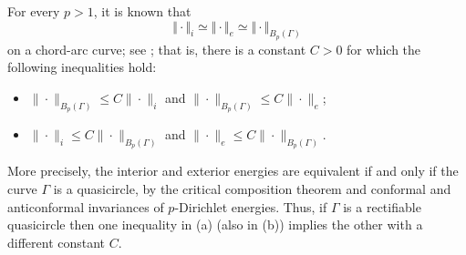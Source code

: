 \documentclass[11pt]{article}
\numberwithin{equation}{section}
\theoremstyle{remark}
\begin{document}
For every $p>1$, it is known that
\[
\Vert\cdot\Vert_i\simeq\Vert\cdot\Vert_e
\simeq\Vert\cdot\Vert_{B_p(\Gamma)}
\]
on a chord-arc curve; see \cite{LS}; that is,  there
is a constant $C>0$ for which the following inequalities hold:
 \begin{itemize}
\item[(a)]$\|\cdot\|_{B_{p}(\Gamma)}\le C \|\cdot\|_{i}$ and $\|\cdot\|_{B_{p}(\Gamma)}\le C \|\cdot\|_{e}$;
\item[(b)]$\|\cdot\|_{i}\le C\|\cdot\|_{B_{p}(\Gamma)}$ and $\|\cdot\|_{e}\le C\|\cdot\|_{B_{p}(\Gamma)}$.
\end{itemize}
More precisely, the interior and
exterior energies are equivalent if and only if the curve $\Gamma$ is a quasicircle, by the critical
composition theorem \cite[Theorem~12]{Bou} and conformal and anticonformal invariances of $p$-Dirichlet energies. Thus, if $\Gamma$ is a rectifiable quasicircle then one inequality in \rm{(a)} (also in \rm{(b)}) implies the other with a different constant $C$. 
\end{document}

